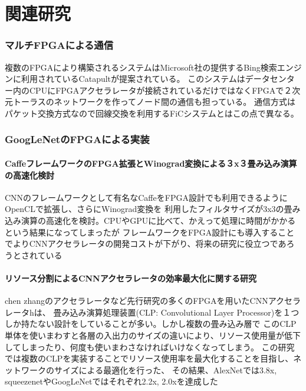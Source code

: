 \chapter{関連研究}
{
\label{chap:survey}

\subsection{マルチFPGAによる通信}
複数のFPGAにより構築されるシステムはMicrosoft社の提供するBing検索エンジンに利用されているCatapultが提案されている。
このシステムはデータセンター内のCPUにFPGAアクセラレータが接続されているだけではなくFPGAで２次元トーラスのネットワークを作ってノード間の通信も担っている。
通信方式はパケット交換方式なので回線交換を利用するFiCシステムとはこの点で異なる。

\subsection{GoogLeNetのFPGAによる実装}

\subsubsection{CaffeフレームワークのFPGA拡張とWinograd変換による３x３畳み込み演算の高速化検討}
CNNのフレームワークとして有名なCaffeをFPGA設計でも利用できるようにOpenCLで拡張し、さらにWinograd変換を
利用したフィルタサイズが3x3の畳み込み演算の高速化を検討。CPUやGPUに比べて、かえって処理に時間がかかるという結果になってしまったが
フレームワークをFPGA設計にも導入することでよりCNNアクセラレータの開発コストが下がり、将来の研究に役立つであろうとされている
\subsubsection{リソース分割によるCNNアクセラレータの効率最大化に関する研究}
chen zhangのアクセラレータなど先行研究の多くのFPGAを用いたCNNアクセラレータhは、
畳み込み演算処理装置(CLP: Convolutional Layer Processor)を１つしか持たない設計をしていることが多い。しかし複数の畳み込み層で
このCLP単体を使いまわすと各層の入出力のサイズの違いにより、リソース使用量が低下してしまったり、何度も使いまわさなければいけなくなってしまう。
この研究では複数のCLPを実装することでリソース使用率を最大化することを目指し、ネットワークのサイズによる最適化を行った、
その結果、AlexNetでは3.8x, squeezenetやGoogLeNetではそれぞれ2.2x, 2.0xを達成した
}